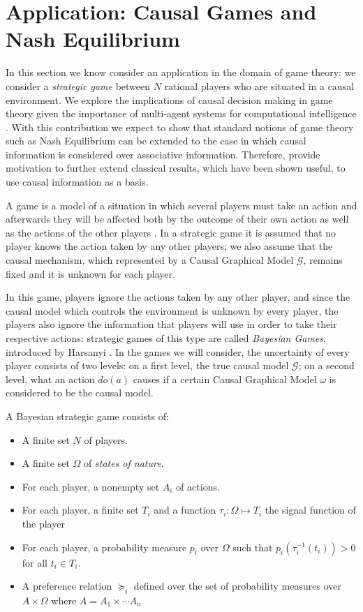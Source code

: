 \documentclass{svjour3}                     %
\begin{document}
\section{Application: Causal Games and Nash Equilibrium}
\label{causal_games}
In this section we know consider an application in the domain of game theory: we consider a \textit{strategic game} between $N$ rational players who are situated in a causal environment. We explore the implications of causal decision making in game theory given the importance of multi-agent systems for computational intelligence \cite{shoham2008multiagen,wooldridge2009introductiont}. With this contribution we expect to show that standard notions of game theory such as Nash Equilibrium can be extended to the case in which causal information is considered over associative information. Therefore, provide motivation to further extend classical results, which have been shown useful, to use causal information as a basis.

A game is a model of a situation in which several players must take an action and afterwards they will be affected both by the outcome of their own action as well as the actions of the other players \citep{osborne1994course}. In a strategic game it is assumed that no player knows the action taken by any other players; we also assume that the causal mechanism, which represented by a Causal Graphical Model $\mathcal{G}$, remains fixed and it is unknown for each player. 

In this game, players ignore the actions taken by any other player, and since the causal model which controls the environment is unknown by every player, the players also ignore the information that players will use in order to take their respective actions: strategic games of this type are called \textit{Bayesian Games}, introduced by Harsanyi \citep{harsanyi1967games1,harsanyi1968games2,harsanyi1968games3}. In the games we will consider, the uncertainty of every player consists of two levels: on a first level, the true causal model $\mathcal{G}$; on a second level, what an action $do(a)$ causes if a certain Causal Graphical Model $\omega$ is considered to be the causal model. 
\begin{definition}
A Bayesian strategic game \citep{osborne1994course} consists of:
\begin{itemize}
\item A finite set $N$ of players.
\item A finite set $\Omega$ of \textit{states of nature}.
\item For each player, a nonempty set $A_i$ of actions.
\item For each player, a finite set $T_i$ and a function $\tau_i : \Omega \mapsto T_i$ the signal function of the player
\item For each player, a probability measure $p_i$ over $\Omega$ such that $p_i (\tau^{-1}_i (t_i))>0$ for all $t_i \in T_i$.
\item A preference relation $\succeq_i$ defined over the set of probability measures over $A \times \Omega$ where $A= A_1 \times \cdots A_n$
\end{itemize}
\end{definition}
\end{document}
